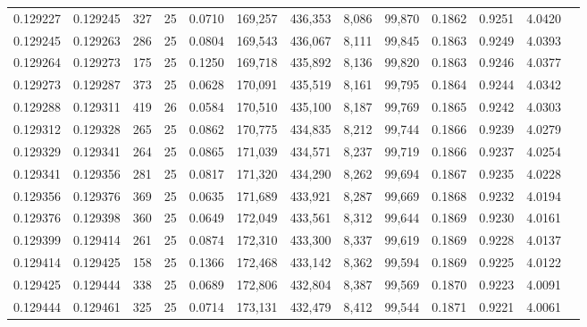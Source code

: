 \begin{tabular}{rrrrrrrrrrrrr}
0.129227 & 0.129245 &   327 &  25 &                                     0.0710 & 169,257 & 436,353 &   8,086 &  99,870 & 0.1862 & 0.9251 & 4.0420 \\
0.129245 & 0.129263 &   286 &  25 &                                     0.0804 & 169,543 & 436,067 &   8,111 &  99,845 & 0.1863 & 0.9249 & 4.0393 \\
0.129264 & 0.129273 &   175 &  25 &                                     0.1250 & 169,718 & 435,892 &   8,136 &  99,820 & 0.1863 & 0.9246 & 4.0377 \\
0.129273 & 0.129287 &   373 &  25 &                                     0.0628 & 170,091 & 435,519 &   8,161 &  99,795 & 0.1864 & 0.9244 & 4.0342 \\
0.129288 & 0.129311 &   419 &  26 &                                     0.0584 & 170,510 & 435,100 &   8,187 &  99,769 & 0.1865 & 0.9242 & 4.0303 \\
0.129312 & 0.129328 &   265 &  25 &                                     0.0862 & 170,775 & 434,835 &   8,212 &  99,744 & 0.1866 & 0.9239 & 4.0279 \\
0.129329 & 0.129341 &   264 &  25 &                                     0.0865 & 171,039 & 434,571 &   8,237 &  99,719 & 0.1866 & 0.9237 & 4.0254 \\
0.129341 & 0.129356 &   281 &  25 &                                     0.0817 & 171,320 & 434,290 &   8,262 &  99,694 & 0.1867 & 0.9235 & 4.0228 \\
0.129356 & 0.129376 &   369 &  25 &                                     0.0635 & 171,689 & 433,921 &   8,287 &  99,669 & 0.1868 & 0.9232 & 4.0194 \\
0.129376 & 0.129398 &   360 &  25 &                                     0.0649 & 172,049 & 433,561 &   8,312 &  99,644 & 0.1869 & 0.9230 & 4.0161 \\
0.129399 & 0.129414 &   261 &  25 &                                     0.0874 & 172,310 & 433,300 &   8,337 &  99,619 & 0.1869 & 0.9228 & 4.0137 \\
0.129414 & 0.129425 &   158 &  25 &                                     0.1366 & 172,468 & 433,142 &   8,362 &  99,594 & 0.1869 & 0.9225 & 4.0122 \\
0.129425 & 0.129444 &   338 &  25 &                                     0.0689 & 172,806 & 432,804 &   8,387 &  99,569 & 0.1870 & 0.9223 & 4.0091 \\
0.129444 & 0.129461 &   325 &  25 &                                     0.0714 & 173,131 & 432,479 &   8,412 &  99,544 & 0.1871 & 0.9221 & 4.0061 \\

\end{tabular}
